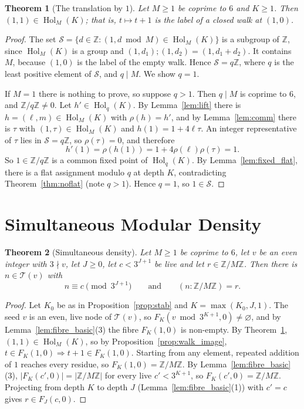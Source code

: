 \documentclass[11pt,reqno,oneside]{amsart}
\theoremstyle{plain}
\newtheorem{theorem}{Theorem}[section]
\theoremstyle{definition}
\numberwithin{equation}{section}
\newcommand{\Z}{\mathbb{Z}}
\newcommand{\ZM}{\Z/M\Z}
\newcommand{\Zq}{\Z/q\Z}
\newcommand{\Tr}{\mathcal{T}}
\DeclareMathOperator{\Hol}{Hol}
\newcommand{\then}{\mathbin{;}}
\newcommand{\Fib}[3]{F_{#1}(#2,#3)}
\begin{document}
\begin{theorem}[The translation by $1$]\label{thm:translation}
Let $M\ge1$ be coprime to $6$ and $K\ge1$. Then $(1,1)\in\Hol_M(K)$; that is, $t\mapsto t+1$ is the label of a closed walk at $(1,0)$.
\end{theorem}
\begin{proof}
The set $\mathcal S=\{d\in\Z:(1,d\bmod M)\in\Hol_M(K)\}$ is a subgroup of $\Z$, since $\Hol_M(K)$ is a group and $(1,d_1)\then(1,d_2)=(1,d_1+d_2)$. It contains $M$, because $(1,0)$ is the label of the empty walk. Hence $\mathcal S=q\Z$, where $q$ is the least positive element of $\mathcal S$, and $q\mid M$. We show $q=1$.

If $M=1$ there is nothing to prove, so suppose $q>1$. Then $q\mid M$ is coprime to $6$, and $\Zq\ne0$. Let $h'\in\Hol_q(K)$. By Lemma~\ref{lem:lift} there is $h=(\ell,m)\in\Hol_M(K)$ with $\rho(h)=h'$, and by Lemma~\ref{lem:comm} there is $\tau$ with $(1,\tau)\in\Hol_M(K)$ and $h(1)=1+4\ell\tau$. An integer representative of $\tau$ lies in $\mathcal S=q\Z$, so $\rho(\tau)=0$, and therefore
\[
h'(1)=\rho(h(1))=1+4\rho(\ell)\rho(\tau)=1 .
\]
So $1\in\Zq$ is a common fixed point of $\Hol_q(K)$. By Lemma~\ref{lem:fixed_flat}, there is a flat assignment modulo $q$ at depth $K$, contradicting Theorem~\ref{thm:noflat} (note $q>1$). Hence $q=1$, so $1\in\mathcal S$.
\end{proof}

\section{Simultaneous Modular Density}\label{sec:density}

\begin{theorem}[Simultaneous density]\label{thm:density}
Let $M\ge1$ be coprime to $6$, let $v$ be an even integer with $3\nmid v$, let $J\ge0$, let $c<3^{J+1}$ be live and let $r\in\ZM$. Then there is $n\in\Tr(v)$ with
\[
n\equiv c\pmod{3^{J+1}}\qquad\text{and}\qquad(n:\ZM)=r .
\]
\end{theorem}
\begin{proof}
Let $K_0$ be as in Proposition~\ref{prop:stab} and $K=\max(K_0,J,1)$. The seed $v$ is an even, live node of $\Tr(v)$, so $\Fib K{v\bmod3^{K+1}}0\ne\varnothing$, and by Lemma~\ref{lem:fibre_basic}(3) the fibre $\Fib K10$ is non-empty. By Theorem~\ref{thm:translation}, $(1,1)\in\Hol_M(K)$, so by Proposition~\ref{prop:walk_image}, $t\in\Fib K10\Rightarrow t+1\in\Fib K10$. Starting from any element, repeated addition of $1$ reaches every residue, so $\Fib K10=\ZM$. By Lemma~\ref{lem:fibre_basic}(3), $|\Fib K{c'}0|=|\ZM|$ for every live $c'<3^{K+1}$, so $\Fib K{c'}0=\ZM$. Projecting from depth $K$ to depth $J$ (Lemma~\ref{lem:fibre_basic}(1)) with $c'=c$ gives $r\in\Fib Jc0$.
\end{proof}
\end{document}
